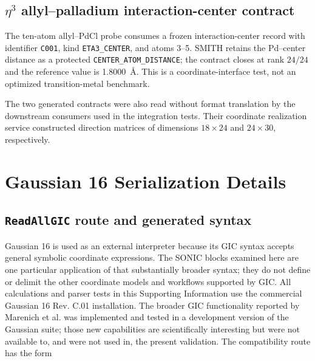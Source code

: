 \documentclass[10pt]{article}
\newcommand{\SMITH}{\textsc{SMITH}}
\begin{document}
\subsection{\texorpdfstring{$\eta^3$}{eta3} allyl--palladium interaction-center contract}

The ten-atom allyl--PdCl probe consumes a frozen interaction-center record with
identifier \texttt{C001}, kind \texttt{ETA3\_CENTER}, and atoms 3--5.  \SMITH
retains the Pd--center distance as a protected
\texttt{CENTER\_ATOM\_DISTANCE}; the contract closes at rank \(24/24\) and the
reference value is 1.8000~\AA.  This is a coordinate-interface test, not an
optimized transition-metal benchmark.





The two generated contracts were also read without format translation by the
downstream consumers used in the integration tests.  Their coordinate
realization service constructed direction matrices of dimensions
\(18\times24\) and \(24\times30\), respectively.

\section{Gaussian 16 Serialization Details}

\subsection{\texttt{ReadAllGIC} route and generated syntax}

Gaussian 16 is used as an external interpreter because its GIC syntax accepts
general symbolic coordinate expressions.  The SONIC blocks examined here are
one particular application of that substantially broader syntax; they do not
define or delimit the other coordinate models and workflows supported by GIC.
All calculations and parser tests in this Supporting Information use the
commercial Gaussian 16 Rev. C.01 installation.  The broader GIC functionality
reported by Marenich et al. was implemented and tested in a development version
of the Gaussian suite; those new capabilities are scientifically interesting
but were not available to, and were not used in, the present validation.
The compatibility route has the form
\end{document}
